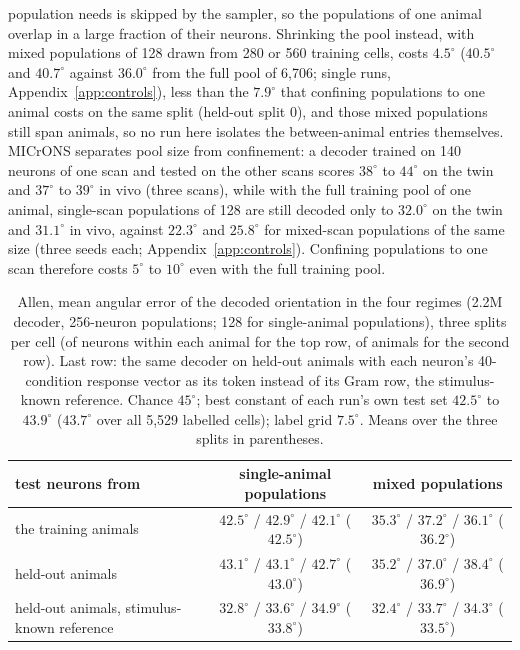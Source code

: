 \documentclass[11pt]{article}
\begin{document}
population needs is skipped by the sampler, so the populations of one animal overlap in a large fraction of their neurons. Shrinking the pool instead, with mixed populations of 128 drawn from 280 or 560 training cells, costs $4.5^\circ$ ($40.5^\circ$ and $40.7^\circ$ against $36.0^\circ$ from the full pool of 6,706; single runs, Appendix~\ref{app:controls}), less than the $7.9^\circ$ that confining populations to one animal costs on the same split (held-out split 0), and those mixed populations still span animals, so no run here isolates the between-animal entries themselves. MICrONS separates pool size from confinement: a decoder trained on 140 neurons of one scan and tested on the other scans scores $38^\circ$ to $44^\circ$ on the twin and $37^\circ$ to $39^\circ$ in vivo (three scans), while with the full training pool of one animal, single-scan populations of 128 are still decoded only to $32.0^\circ$ on the twin and $31.1^\circ$ in vivo, against $22.3^\circ$ and $25.8^\circ$ for mixed-scan populations of the same size (three seeds each; Appendix~\ref{app:controls}). Confining populations to one scan therefore costs $5^\circ$ to $10^\circ$ even with the full training pool.

\begin{table}[tbp]
  \centering\footnotesize
  \caption{Allen, mean angular error of the decoded orientation in the four regimes (2.2M decoder, 256-neuron populations; 128 for single-animal populations), three splits per cell (of neurons within each animal for the top row, of animals for the second row). Last row: the same decoder on held-out animals with each neuron's 40-condition response vector as its token instead of its Gram row, the stimulus-known reference. Chance $45^\circ$; best constant of each run's own test set $42.5^\circ$ to $43.9^\circ$ ($43.7^\circ$ over all 5,529 labelled cells); label grid $7.5^\circ$. Means over the three splits in parentheses.}
  \label{tab:allen}
  \begin{tabular}{lcc}
    \toprule
    test neurons from & single-animal populations & mixed populations \\
    \midrule
    the training animals & $42.5^\circ$ / $42.9^\circ$ / $42.1^\circ$ ($42.5^\circ$) & $35.3^\circ$ / $37.2^\circ$ / $36.1^\circ$ ($36.2^\circ$) \\
    held-out animals & $43.1^\circ$ / $43.1^\circ$ / $42.7^\circ$ ($43.0^\circ$) & $35.2^\circ$ / $37.0^\circ$ / $38.4^\circ$ ($36.9^\circ$) \\
    \midrule
    held-out animals, stimulus-known reference & $32.8^\circ$ / $33.6^\circ$ / $34.9^\circ$ ($33.8^\circ$) & $32.4^\circ$ / $33.7^\circ$ / $34.3^\circ$ ($33.5^\circ$) \\
    \bottomrule
  \end{tabular}
\end{table}
\end{document}
